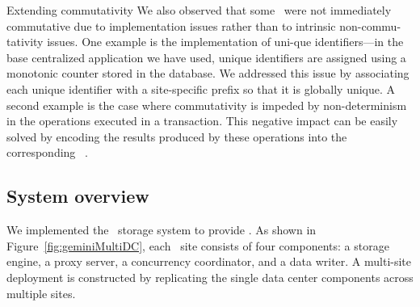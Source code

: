 \changebars{}
{
{Extending commutativity}
We also observed that some \transactions\ were not immediately commutative due to implementation issues rather than to intrinsic non-commu-tativity issues.
One example is the implementation of uni-que identifiers---in the base centralized application we have used, unique identifiers are assigned using a monotonic counter stored in the database.
We addressed this issue by associating each unique identifier with a site-specific prefix so that it is globally unique.
A second example is the case where commutativity is impeded by non-determinism in the operations executed in a transaction. This negative %
impact can be easily solved by encoding the results produced by these operations into the corresponding \shadow\ \operations.
}
\fi


\subsection{System overview}
We implemented the \gemini\ storage system to provide \RBc. As shown in Figure~\ref{fig:geminiMultiDC}, each \gemini\ site consists of four components:
a storage engine, a proxy server, a concurrency coordinator, and a
 data writer. A multi-site deployment is constructed by replicating
 the single data center components across multiple sites.

